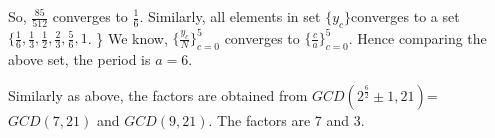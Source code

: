 So, $\frac{85}{512}$ converges to $\frac{1}{6}$. Similarly, all elements in set $\{y_c\}$converges to a set $\{\frac{1}{6},\frac{1}{3},\frac{1}{2},\frac{2}{3}, \frac{5}{6}, 1$.
\}
We know, $\{\frac{y_c}{N}\}_{c=0}^5$ converges to $\{\frac{c}{a}\}_{c=0}^5$. Hence comparing the above set, the period is $a=6$.

Similarly as above, the factors are obtained from $GCD(2^{\frac{6}{2}} \pm 1, 21)$= $GCD(7,21)$ and $GCD(9,21)$. The factors are 7 and 3.

